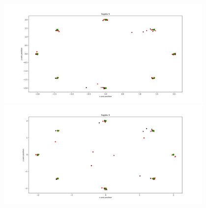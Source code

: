 \documentclass[pdf]{beamer}
\begin{document}
\begin{frame}
\begin{columns}
\begin{column}{0.4\textwidth}
		\end{column}
		\begin{column}{0.6\textwidth}
			\begin{figure}
				\centering
				\includegraphics[width=\textwidth]{sujeto5/force/trayectorias_puntos}
				\includegraphics[width=\textwidth]{sujeto3/force/trayectorias_puntos}
				
			\end{figure}
		\end{column}
	\end{columns}

\end{frame}
\end{document}
